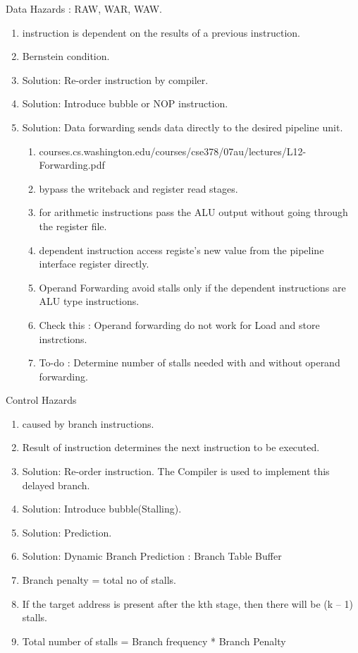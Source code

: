 \begin{enumerate}
\begin{minipage}{\linewidth}
    \item Data Hazards : RAW, WAR, WAW.
    \begin{enumerate}
        \item instruction is dependent on the results of a previous instruction.
        \item Bernstein condition.
        \item Solution: Re-order instruction by compiler.
        \item Solution: Introduce bubble or NOP instruction.
        \item Solution: Data forwarding sends data directly to the desired pipeline unit.
        \begin{enumerate}
            \item courses.cs.washington.edu/courses/cse378/07au/lectures/L12-Forwarding.pdf
            \item bypass the writeback and register read stages.
            \item for arithmetic instructions pass the ALU output without going through the register file.
            \item dependent instruction access registe's new value from the pipeline interface register directly.
            \item Operand Forwarding avoid stalls only if the dependent instructions are ALU type instructions.
            \item Check this : Operand forwarding do not work for Load and store instrctions.
            \item To-do : Determine number of stalls needed with and without operand forwarding.
        \end{enumerate}
    \end{enumerate}

    \item Control Hazards
    \begin{enumerate}
        \item caused by branch instructions.
        \item Result of instruction determines the next instruction to be executed.
        \item Solution: Re-order instruction. The Compiler is used to implement this delayed branch.
        \item Solution: Introduce bubble(Stalling).
        \item Solution: Prediction.
        \item Solution: Dynamic Branch Prediction : Branch Table Buffer
        \item Branch penalty = total no of stalls.
        \item If the target address is present after the kth stage, then there will be (k – 1) stalls.
        \item Total number of stalls = Branch frequency * Branch Penalty
    \end{enumerate}
    \end{minipage}


\end{enumerate}
